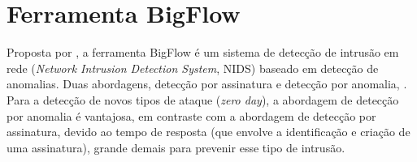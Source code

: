 \begin{table}[ht]
\begin{scriptsize}
\begin{tabularx}{\linewidth}{X|X|X|X|X|X}
  \end{tabularx}
  \label{tab:summary}
  \end{scriptsize}
\end{table}

\section{Ferramenta BigFlow}

Proposta por , a ferramenta BigFlow é um sistema de
detecção de intrusão em rede (\emph{Network Intrusion Detection System}, NIDS)
baseado em detecção de anomalias.
Duas abordagens, detecção por assinatura e detecção por anomalia, 
.
Para a detecção de novos tipos de ataque (\emph{zero day}), a abordagem de
detecção por anomalia é vantajosa, em contraste com a abordagem de detecção por
assinatura, devido ao tempo de resposta (que envolve a identificação e criação de
uma assinatura), grande demais para prevenir esse tipo de intrusão.

